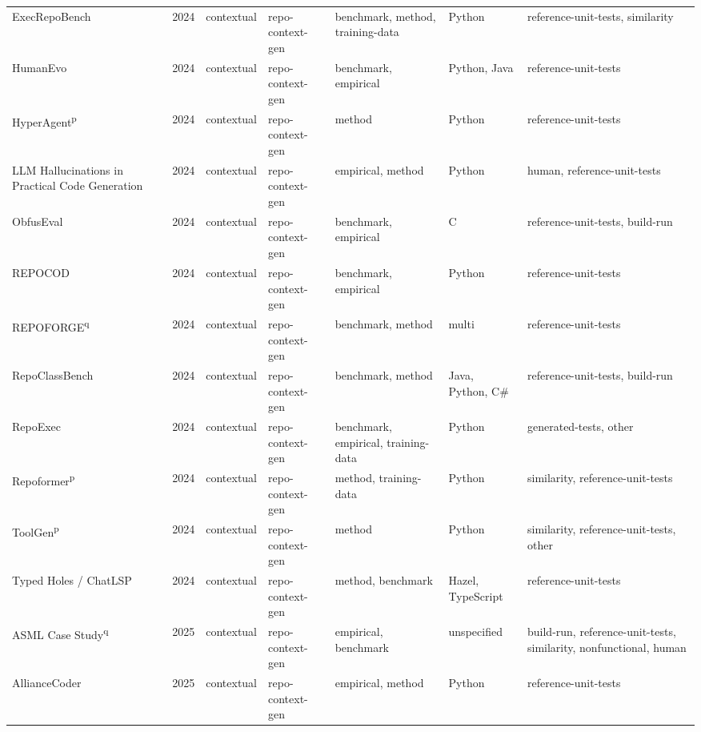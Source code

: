 {\begin{longtable}{@{}p{2.8cm}lllp{1.9cm}p{1.5cm}p{2.9cm}@{}}
ExecRepoBench~\cite{ExecRepoBench2024} & 2024 & contextual & repo-context-gen & benchmark, method, training-data & Python & reference-unit-tests, similarity \\
HumanEvo~\cite{HumanEvo2024} & 2024 & contextual & repo-context-gen & benchmark, empirical & Python, Java & reference-unit-tests \\
HyperAgent\textsuperscript{p}~\cite{HyperAgent2024} & 2024 & contextual & repo-context-gen & method & Python & reference-unit-tests \\
LLM Hallucinations in Practical Code Generation~\cite{LLMHallucinationsinPract2024} & 2024 & contextual & repo-context-gen & empirical, method & Python & human, reference-unit-tests \\
ObfusEval~\cite{ObfusEval2024} & 2024 & contextual & repo-context-gen & benchmark, empirical & C & reference-unit-tests, build-run \\
REPOCOD~\cite{REPOCOD2024} & 2024 & contextual & repo-context-gen & benchmark, empirical & Python & reference-unit-tests \\
REPOFORGE\textsuperscript{q}~\cite{REPOFORGE2024} & 2024 & contextual & repo-context-gen & benchmark, method & multi & reference-unit-tests \\
RepoClassBench~\cite{RepoClassBench2024} & 2024 & contextual & repo-context-gen & benchmark, method & Java, Python, C\# & reference-unit-tests, build-run \\
RepoExec~\cite{RepoExec2024} & 2024 & contextual & repo-context-gen & benchmark, empirical, training-data & Python & generated-tests, other \\
Repoformer\textsuperscript{p}~\cite{Repoformer2024} & 2024 & contextual & repo-context-gen & method, training-data & Python & similarity, reference-unit-tests \\
ToolGen\textsuperscript{p}~\cite{ToolGen2024} & 2024 & contextual & repo-context-gen & method & Python & similarity, reference-unit-tests, other \\
Typed Holes / ChatLSP~\cite{TypedHolesChatLSP2024} & 2024 & contextual & repo-context-gen & method, benchmark & Hazel, TypeScript & reference-unit-tests \\
ASML Case Study\textsuperscript{q}~\cite{ASMLCaseStudy2025} & 2025 & contextual & repo-context-gen & empirical, benchmark & unspecified & build-run, reference-unit-tests, similarity, nonfunctional, human \\
AllianceCoder~\cite{AllianceCoder2025} & 2025 & contextual & repo-context-gen & empirical, method & Python & reference-unit-tests \\

\end{longtable}}
